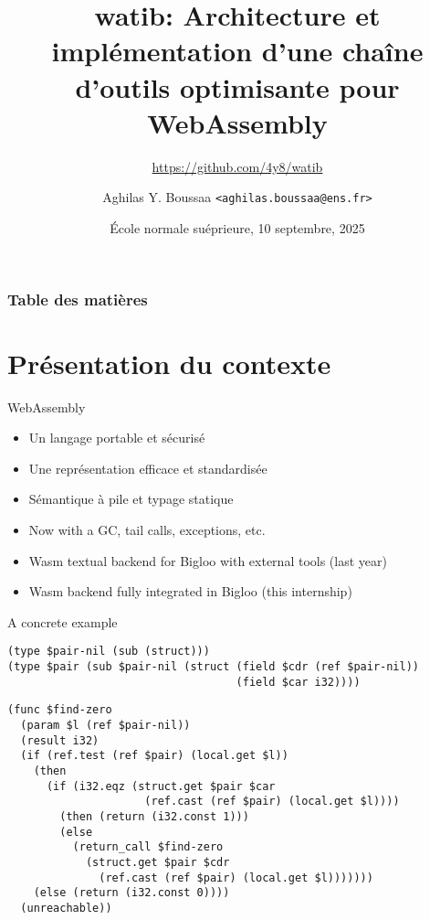 \documentclass{beamer}
\author{Aghilas Y. Boussaa \texttt{<aghilas.boussaa@ens.fr>}}
\title{watib: Architecture et implémentation d'une chaîne d'outils optimisante pour WebAssembly}
\subtitle{\url{https://github.com/4y8/watib}}
\institute{École normale supérieure}
\begin{document}
\frame{\titlepage}
\date{École normale suéprieure, 10 septembre, 2025}
\begin{frame}
\frametitle{Table des matières}
\tableofcontents
\end{frame}

\section{Présentation du contexte}
\begin{frame}{WebAssembly}
  \begin{itemize}
    \item Un langage portable et sécurisé
    \item Une représentation efficace et standardisée
    \item Sémantique à pile et typage statique\pause
    \item Now with a GC, tail calls, exceptions, etc.\pause
    \item Wasm textual backend for Bigloo with external tools (last year)\pause
    \item Wasm backend fully integrated in Bigloo (this internship)
  \end{itemize}
\end{frame}
\begin{frame}[fragile]{A concrete example}
\footnotesize
\begin{verbatim}
(type $pair-nil (sub (struct)))
(type $pair (sub $pair-nil (struct (field $cdr (ref $pair-nil))
                                   (field $car i32))))
\end{verbatim}
\pause
\begin{verbatim}
(func $find-zero
  (param $l (ref $pair-nil))
  (result i32)
  (if (ref.test (ref $pair) (local.get $l))
    (then
      (if (i32.eqz (struct.get $pair $car
                     (ref.cast (ref $pair) (local.get $l))))
        (then (return (i32.const 1)))
        (else
          (return_call $find-zero
            (struct.get $pair $cdr
              (ref.cast (ref $pair) (local.get $l)))))))
    (else (return (i32.const 0))))
  (unreachable))
\end{verbatim}
\end{frame}
\end{document}
